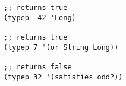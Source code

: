\begin{lstlisting}[style=reclojureClojure]
;; returns true
(typep -42 'Long)

;; returns true
(typep 7 '(or String Long))

;; returns false
(typep 32 '(satisfies odd?))
\end{lstlisting}
